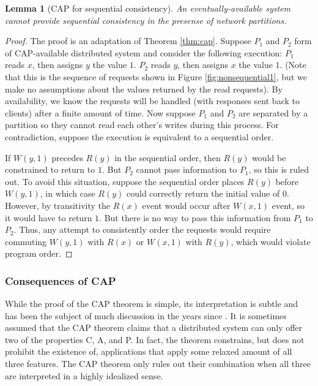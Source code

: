 \documentclass[]             %
{NASA}                       %
\newtheorem{lemma}[theorem]{Lemma}
\theoremstyle{definition}
\begin{document}
\begin{lemma}[CAP for sequential consistency]
  \label{thm:cap-sequential}
  An eventually-available system cannot provide sequential consistency in the presense of network partitions.
\end{lemma}
\begin{proof}

  The proof is an adaptation of Theorem \ref{thm:cap}. Suppose $P_1$ and
  $P_2$ form of CAP-available distributed system and consider the
  following execution: $P_1$ reads $x$, then assigns $y$ the value
  $1$. $P_2$ reads $y$, then assigns $x$ the value $1$. (Note that this
  is the sequence of requests shown in Figure \ref{fig:nonsequential1},
  but we make no assumptions about the values returned by the read
  requests). By availability, we know the requests will be handled (with
  responses sent back to clients) after a finite amount of time. Now
  suppose $P_1$ and $P_2$ are separated by a partition so they cannot
  read each other's writes during this process. For contradiction,
  suppose the execution is equivalent to a sequential order.

  If $W(y,1)$ precedes $R(y)$ in the sequential order, then $R(y)$ would
  be constrained to return to $1$. But $P_2$ cannot pass information to
  $P_1$, so this is ruled out. To avoid this situation, suppose the
  sequential order places $R(y)$ before $W(y,1)$, in which case $R(y)$
  could correctly return the initial value of $0$. However, by
  transitivity the $R(x)$ event would occur after $W(x,1)$ event, so it
  would have to return $1$. But there is no way to pass this information
  from $P_1$ to $P_2$. Thus, any attempt to consistently order the
  requests would require commuting $W(y,1)$ with $R(x)$ or $W(x,1)$ with
  $R(y)$, which would violate program order.
\end{proof}


\subsubsection{Consequences of CAP}
\label{interpretation-of-the-cap-theorem}

While the proof of the CAP theorem is simple, its interpretation is
subtle and has been the subject of much discussion in the years since
\cite{2012CAP12Years}. It is sometimes assumed that the CAP theorem claims that
a distributed system can only offer two of the properties C, A, and P.
In fact, the theorem constrains, but does not prohibit the existence of,
applications that apply some relaxed amount of all three features. The
CAP theorem only rules out their combination when all three are
interpreted in a highly idealized sense.
\end{document}
